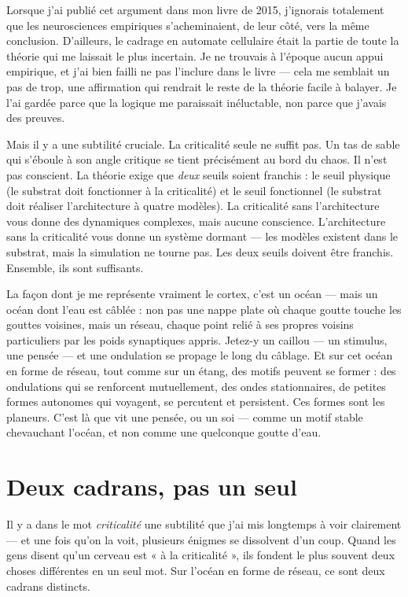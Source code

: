 \documentclass[11pt, twoside, openright]{book}
\begin{document}
Lorsque j'ai publié cet argument dans mon livre de 2015, j'ignorais totalement que les neurosciences empiriques s'acheminaient, de leur côté, vers la même conclusion. D'ailleurs, le cadrage en automate cellulaire était la partie de toute la théorie qui me laissait le plus incertain. Je ne trouvais à l'époque aucun appui empirique, et j'ai bien failli ne pas l'inclure dans le livre --- cela me semblait un pas de trop, une affirmation qui rendrait le reste de la théorie facile à balayer. Je l'ai gardée parce que la logique me paraissait inéluctable, non parce que j'avais des preuves.

Mais il y a une subtilité cruciale. La criticalité seule ne suffit pas. Un tas de sable qui s'éboule à son angle critique se tient précisément au bord du chaos. Il n'est pas conscient. La théorie exige que \textit{deux} seuils soient franchis : le seuil physique (le substrat doit fonctionner à la criticalité) et le seuil fonctionnel (le substrat doit réaliser l'architecture à quatre modèles). La criticalité sans l'architecture vous donne des dynamiques complexes, mais aucune conscience. L'architecture sans la criticalité vous donne un système dormant --- les modèles existent dans le substrat, mais la simulation ne tourne pas. Les deux seuils doivent être franchis. Ensemble, ils sont suffisants.

La façon dont je me représente vraiment le cortex, c'est un océan --- mais un océan dont l'eau est câblée : non pas une nappe plate où chaque goutte touche les gouttes voisines, mais un réseau, chaque point relié à ses propres voisins particuliers par les poids synaptiques appris. Jetez-y un caillou --- un stimulus, une pensée --- et une ondulation se propage le long du câblage. Et sur cet océan en forme de réseau, tout comme sur un étang, des motifs peuvent se former : des ondulations qui se renforcent mutuellement, des ondes stationnaires, de petites formes autonomes qui voyagent, se percutent et persistent. Ces formes sont les planeurs. C'est là que vit une pensée, ou un soi --- comme un motif stable chevauchant l'océan, et non comme une quelconque goutte d'eau.

\section*{Deux cadrans, pas un seul}

Il y a dans le mot \textit{criticalité} une subtilité que j'ai mis longtemps à voir clairement --- et une fois qu'on la voit, plusieurs énigmes se dissolvent d'un coup. Quand les gens disent qu'un cerveau est « à la criticalité », ils fondent le plus souvent deux choses différentes en un seul mot. Sur l'océan en forme de réseau, ce sont deux cadrans distincts.
\end{document}

